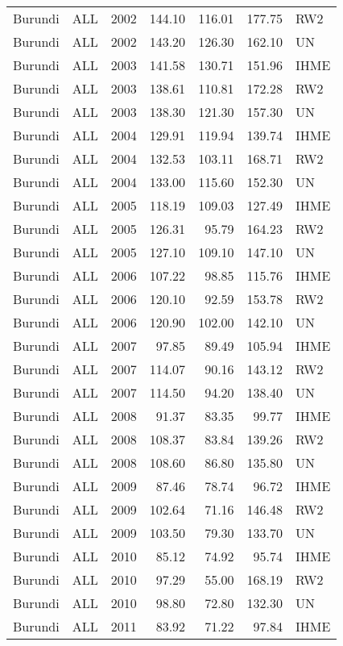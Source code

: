 \begin{longtable}{lllrrrl}
  Burundi & ALL & 2002 & 144.10 & 116.01 & 177.75 & RW2 \\ 
  Burundi & ALL & 2002 & 143.20 & 126.30 & 162.10 & UN \\ 
  Burundi & ALL & 2003 & 141.58 & 130.71 & 151.96 & IHME \\ 
  Burundi & ALL & 2003 & 138.61 & 110.81 & 172.28 & RW2 \\ 
  Burundi & ALL & 2003 & 138.30 & 121.30 & 157.30 & UN \\ 
  Burundi & ALL & 2004 & 129.91 & 119.94 & 139.74 & IHME \\ 
  Burundi & ALL & 2004 & 132.53 & 103.11 & 168.71 & RW2 \\ 
  Burundi & ALL & 2004 & 133.00 & 115.60 & 152.30 & UN \\ 
  Burundi & ALL & 2005 & 118.19 & 109.03 & 127.49 & IHME \\ 
  Burundi & ALL & 2005 & 126.31 & 95.79 & 164.23 & RW2 \\ 
  Burundi & ALL & 2005 & 127.10 & 109.10 & 147.10 & UN \\ 
  Burundi & ALL & 2006 & 107.22 & 98.85 & 115.76 & IHME \\ 
  Burundi & ALL & 2006 & 120.10 & 92.59 & 153.78 & RW2 \\ 
  Burundi & ALL & 2006 & 120.90 & 102.00 & 142.10 & UN \\ 
  Burundi & ALL & 2007 & 97.85 & 89.49 & 105.94 & IHME \\ 
  Burundi & ALL & 2007 & 114.07 & 90.16 & 143.12 & RW2 \\ 
  Burundi & ALL & 2007 & 114.50 & 94.20 & 138.40 & UN \\ 
  Burundi & ALL & 2008 & 91.37 & 83.35 & 99.77 & IHME \\ 
  Burundi & ALL & 2008 & 108.37 & 83.84 & 139.26 & RW2 \\ 
  Burundi & ALL & 2008 & 108.60 & 86.80 & 135.80 & UN \\ 
  Burundi & ALL & 2009 & 87.46 & 78.74 & 96.72 & IHME \\ 
  Burundi & ALL & 2009 & 102.64 & 71.16 & 146.48 & RW2 \\ 
  Burundi & ALL & 2009 & 103.50 & 79.30 & 133.70 & UN \\ 
  Burundi & ALL & 2010 & 85.12 & 74.92 & 95.74 & IHME \\ 
  Burundi & ALL & 2010 & 97.29 & 55.00 & 168.19 & RW2 \\ 
  Burundi & ALL & 2010 & 98.80 & 72.80 & 132.30 & UN \\ 
  Burundi & ALL & 2011 & 83.92 & 71.22 & 97.84 & IHME \\ 

\end{longtable}
